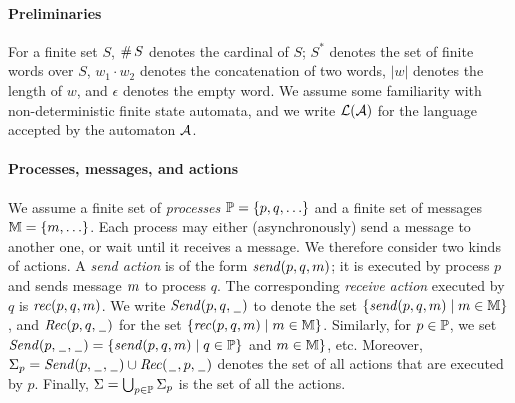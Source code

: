 
\paragraph{\bf Preliminaries}
For a finite set $S$, $\#\,S$ denotes the cardinal of $S$; $S^*$ denotes the set of finite words over $S$,
$w_1\cdot w_2$ denotes the concatenation of two words, $|w|$ denotes the length of $w$, and $\epsilon$ denotes the empty word. We assume some familiarity with non-deterministic
finite state automata,
and we write $\mathcal L(\mathcal{A})$ for the language accepted
by the automaton $\mathcal{A}$.


\paragraph{\bf Processes, messages, and actions}
We assume a finite set of \emph{processes} $\mathbb{P}=\{p,q,\ldots\}$ and a finite set of messages $\mathbb{M}=\{m,\ldots\}$.
Each process may either (asynchronously) send a message to another one, or wait until it receives a message.
We therefore consider two kinds of actions. A \emph{send action} is of the form $\mathit{send}(p, q, m)$;
it is executed by process $p$ and sends message $m$ to process $q$.
The corresponding \emph{receive action} executed by $q$ is $\mathit{rec}(p, q, m)$.
%
We write ${\mathit{Send}(p,q,\hspace{0.1em}\underline{\hspace{0.5em}}\hspace{0.1em})}$ to denote the set $\{\mathit{send}(p, q, m) \mid m \in \mathbb{M}\}$, and
${\mathit{Rec}(p,q,\hspace{0.1em}\underline{\hspace{0.5em}}\hspace{0.1em})}$ for the set $\{\mathit{rec}(p, q, m) \mid m \in \mathbb{M}\}$.
Similarly, for $p \in \mathbb{P}$, we set
${\mathit{Send}(p,\hspace{0.1em}\underline{\hspace{0.5em}}\hspace{0.1em},\hspace{0.1em}\underline{\hspace{0.5em}}\hspace{0.1em})} = \{\mathit{send}(p, q, m) \mid q \in \mathbb{P}
\}$ and $m \in \mathbb{M}\}$, etc.
Moreover, $\Sigma_{p} = {\mathit{Send}(p,\hspace{0.1em}\underline{\hspace{0.5em}}\hspace{0.1em},\hspace{0.1em}\underline{\hspace{0.5em}}\hspace{0.1em})} \cup {\mathit{Rec}(\hspace{0.1em}\underline{\hspace{0.5em}}\hspace{0.1em},p,\hspace{0.1em}\underline{\hspace{0.5em}}\hspace{0.1em})}$ denotes the set of all actions that are
executed by $p$.
Finally, $\Sigma = \bigcup_{p \in \mathbb{P}} \Sigma_{p}$
is the set of all the actions.

